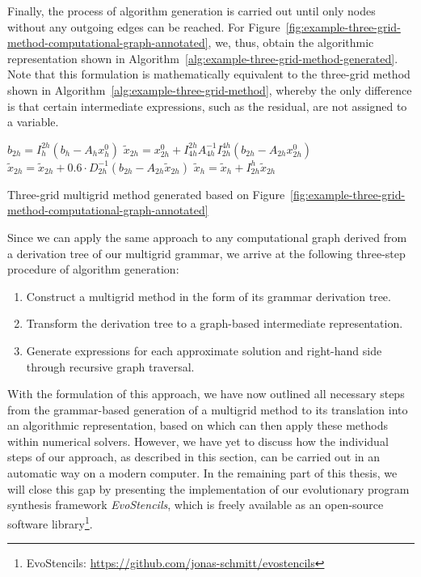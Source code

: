Finally, the process of algorithm generation is carried out until only nodes without any outgoing edges can be reached.
For Figure~\ref{fig:example-three-grid-method-computational-graph-annotated}, we, thus, obtain the algorithmic representation shown in Algorithm~\ref{alg:example-three-grid-method-generated}.
Note that this formulation is mathematically equivalent to the three-grid method shown in Algorithm~\ref{alg:example-three-grid-method}, whereby the only difference is that certain intermediate expressions, such as the residual, are not assigned to a variable.
\begin{algorithm}
	\begin{algorithmic}[1]
		\State $ b_{2h} = I_{h}^{2h} \left(b_{h} - A_h x_{h}^0 \right)$
		\State $ \tilde{x}_{2h} = x^0_{2h} + I_{4h}^{2h} A_{4h}^{-1} I_{2h}^{4h} \left(b_{2h} - A_{2h} x^0_{2h}\right)$
		\State $ \tilde{x}_{2h} = \tilde{x}_{2h} + 0.6 \cdot D_{2h}^{-1} \left(b_{2h} - A_{2h} \tilde{x}_{2h}\right)$
		\State $\tilde{x}_{h} = \tilde{x}_{h}  + I_{2h}^h \tilde{x}_{2h}$
	\end{algorithmic}
	\caption{Three-grid multigrid method generated based on Figure~\ref{fig:example-three-grid-method-computational-graph-annotated}}
	\label{alg:example-three-grid-method-generated}
\end{algorithm}
Since we can apply the same approach to any computational graph derived from a derivation tree of our multigrid grammar, we arrive at the following three-step procedure of algorithm generation:
\begin{enumerate}
	\item Construct a multigrid method in the form of its grammar derivation tree.
	\item Transform the derivation tree to a graph-based intermediate representation.
	\item Generate expressions for each approximate solution and right-hand side through recursive graph traversal.
\end{enumerate}
With the formulation of this approach, we have now outlined all necessary steps from the grammar-based generation of a multigrid method to its translation into an algorithmic representation, based on which can then apply these methods within numerical solvers.
However, we have yet to discuss how the individual steps of our approach, as described in this section, can be carried out in an automatic way on a modern computer.
In the remaining part of this thesis, we will close this gap by presenting the implementation of our evolutionary program synthesis framework \emph{EvoStencils}, which is freely available as an open-source software library\footnote{EvoStencils: \url{https://github.com/jonas-schmitt/evostencils}}.
